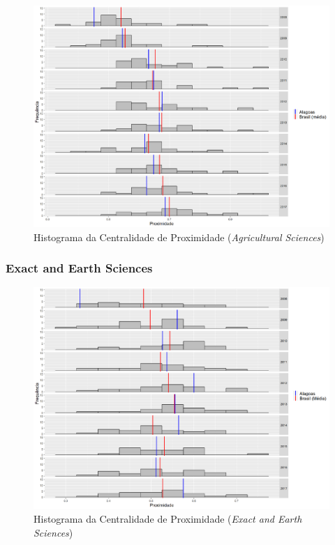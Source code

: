 \begin{figure}[H]
	\centering
	\includegraphics[scale=0.5]{Imagens/agricultural/closeness-hist.pdf}
	\caption{Histograma da Centralidade de Proximidade (\textit{Agricultural Sciences})}
	\label{hist-agri-close}
\end{figure}

\subsubsection{Exact and Earth Sciences}

\begin{figure}[H]
	\centering
	\includegraphics[scale=0.5]{Imagens/exact/closeness-hist.pdf}
	\caption{Histograma da Centralidade de Proximidade (\textit{Exact and Earth Sciences})}
	\label{hist-exact-close}
\end{figure}

